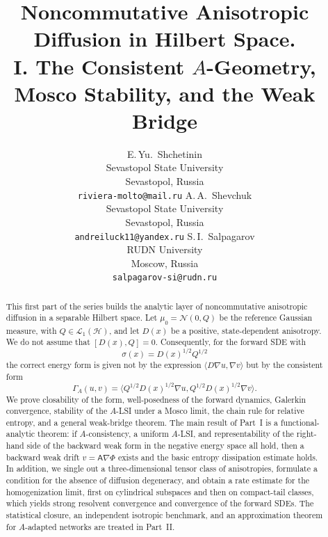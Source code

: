 \documentclass{article}
\title{Noncommutative Anisotropic Diffusion in Hilbert Space.\\
       I. The Consistent \(A\)-Geometry, Mosco Stability, and the Weak Bridge}
\author{%
  E.\,Yu.~Shchetinin \\
  Sevastopol State University \\
  Sevastopol, Russia \\
  \texttt{riviera-molto@mail.ru}
  \And
  A.\,A.~Shevchuk \\
  Sevastopol State University \\
  Sevastopol, Russia \\
  \texttt{andreiluck11@yandex.ru}
  \AND
  S.\,I.~Salpagarov \\
  RUDN University \\
  Moscow, Russia \\
  \texttt{salpagarov-si@rudn.ru}
}
\newcommand{\Hh}{\mathcal H}
\newcommand{\LLone}{\mathcal L_1}
\newcommand{\Asf}{\mathsf A}
\begin{document}
\maketitle
\nocite{DaPratoZabczyk,PrevotRockner,BogachevGaussian,Kuo,BogachevKrylovRockner,AmbrosioSavareZambotti,MaRockner,FukushimaOshimaTakeda,Mosco,KuwaeShioya,BakryGentilLedoux,HolleyStroock,Ledoux,OttoVillani,Villani,BoucheronLugosiMassart,Wainwright,Hyvarinen,Vincent,Song,Allaire,CioranescuDonato,Weickert,LimYoon2023,Pidstrigach2024,FranzeseMichiardi2025,Hagemann2025,DeBortoli2022,DeWitt2020,AnthonyBartlett,vanDerVaartWellner}

\begin{abstract}
This first part of the series builds the analytic layer of noncommutative
anisotropic diffusion in a separable Hilbert space. Let
\(\mu_0=\mathcal N(0,Q)\) be the reference Gaussian measure, with
\(Q\in\LLone(\Hh)\), and let \(D(x)\) be a positive, state-dependent
anisotropy. We do not assume that \([D(x),Q]=0\). Consequently, for the
forward SDE with
\[
        \sigma(x)=D(x)^{1/2}Q^{1/2}
\]
the correct energy form is given not by the expression
\(\langle D\nabla u,\nabla v\rangle\) but by the consistent form
\[
        \Gamma_A(u,v)=
        \langle Q^{1/2}D(x)^{1/2}\nabla u,
        Q^{1/2}D(x)^{1/2}\nabla v\rangle .
\]
We prove closability of the form, well-posedness of the forward dynamics,
Galerkin convergence, stability of the \(A\)-LSI under a Mosco limit, the
chain rule for relative entropy, and a general weak-bridge theorem. The main
result of Part~I is a functional-analytic theorem: if \(A\)-consistency, a
uniform \(A\)-LSI, and representability of the right-hand side of the backward
weak form in the negative energy space all hold, then a backward weak drift
\(v=\Asf\nabla\Phi\) exists and the basic entropy dissipation estimate holds. In
addition, we single out a three-dimensional tensor class of anisotropies, formulate a
condition for the absence of diffusion degeneracy, and obtain a rate estimate
for the homogenization limit, first on cylindrical subspaces and then on
compact-tail classes, which yields strong resolvent convergence and
convergence of the forward SDEs. The statistical closure, an independent
isotropic benchmark, and an approximation theorem for \(A\)-adapted networks
are treated in Part~II.
\end{abstract}

\end{document}

